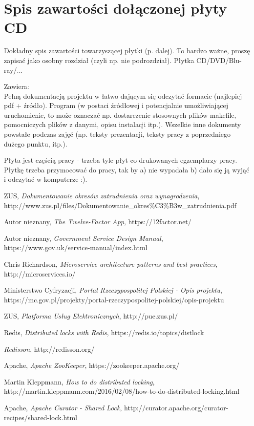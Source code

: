 \documentclass[licencjacka]{pracamgr}
\begin{document}
\appendix
\chapter{Spis zawartości dołączonej płyty CD}\label{r:spis}
Dokładny spis zawartości towarzyszącej płytki (p. dalej). To bardzo ważne, proszę zapisać jako osobny rozdział (czyli np. nie podrozdział). Płytka CD/DVD/Blu-ray/...

Zawiera:\\
Pełną dokumentacją projektu w łatwo dającym się odczytać formacie (najlepiej pdf + źródło).
Program (w postaci źródłowej i potencjalnie umożliwiającej uruchomienie, to może oznaczać np. dostarczenie stosownych plików makefile, pomocniczych plików z danymi, opisu instalacji itp.).
Wszelkie inne dokumenty powstałe podczas zajęć (np. teksty prezentacji, teksty pracy z poprzedniego dużego punktu, itp.).

Płyta jest częścią pracy - trzeba tyle płyt co drukowanych egzemplarzy pracy. Płytkę trzeba przymocować do pracy, tak by a) nie wypadała b) dało się ją wyjąć i odczytać w komputerze :).

\begin{thebibliography}{99}

 ZUS, \textit{Dokumentowanie okresów zatrudnienia oraz
	wynagrodzenia}, http://www.zus.pl/files/Dokumentowanie\_okres\%C3\%B3w\_zatrudnienia.pdf

 Autor nieznany, \textit{The Twelve-Factor App}, https://12factor.net/

 Autor nieznany, \textit{Government Service Design Manual},
https://www.gov.uk/service-manual/index.html

 Chris Richardson, \textit{Microservice architecture patterns and best practices},
http://microservices.io/

 Ministerstwo Cyfryzacji, \textit{Portal Rzeczypospolitej Polskiej - Opis projektu},
https://mc.gov.pl/projekty/portal-rzeczypospolitej-polskiej/opis-projektu

 ZUS, \textit{Platforma Usług Elektronicznych},
http://pue.zus.pl/

 Redis, \textit{Distributed locks with Redis},
https://redis.io/topics/distlock

 \textit{Redisson},
http://redisson.org/

 Apache, \textit{Apache ZooKeeper},
https://zookeeper.apache.org/

 Martin Kleppmann, \textit{How to do distributed locking},
http://martin.kleppmann.com/2016/02/08/how-to-do-distributed-locking.html

 Apache, \textit{Apache Curator - Shared Lock},
http://curator.apache.org/curator-recipes/shared-lock.html

\end{thebibliography}
\end{document}

